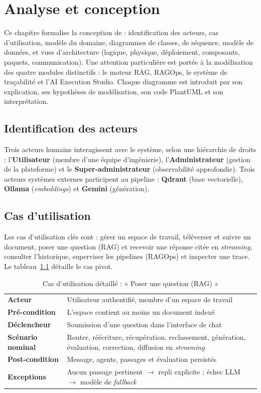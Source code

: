 \chapter{Analyse et conception}
\label{chap:conception}

Ce chapitre formalise la conception de \devpilot{} : identification des acteurs,
cas d'utilisation, modèle du domaine, diagrammes de classes, de séquence, modèle
de données, et vues d'architecture (logique, physique, déploiement, composants,
paquets, communication). Une attention particulière est portée à la modélisation
des quatre modules distinctifs : le moteur RAG, RAGOps, le système de traçabilité
et l'AI Execution Studio. Chaque diagramme est introduit par son explication, ses
hypothèses de modélisation, son code PlantUML et son interprétation.

\section{Identification des acteurs}
Trois acteurs humains interagissent avec le système, selon une hiérarchie de
droits : l'\textbf{Utilisateur} (membre d'une équipe d'ingénierie), l'\textbf{Administrateur}
(gestion de la plateforme) et le \textbf{Super-administrateur} (observabilité
approfondie). Trois acteurs systèmes externes participent au pipeline :
\textbf{Qdrant} (base vectorielle), \textbf{Ollama} (\emph{embeddings}) et
\textbf{Gemini} (génération).

\section{Cas d'utilisation}
Les cas d'utilisation clés sont : gérer un espace de travail, téléverser et suivre
un document, poser une question (RAG) et recevoir une réponse citée en
\emph{streaming}, consulter l'historique, superviser les pipelines (RAGOps) et
inspecter une trace. Le tableau~\ref{tab:uc} détaille le cas pivot.

\begin{table}[H]
\centering\caption{Cas d'utilisation détaillé : « Poser une question (RAG) »}
\label{tab:uc}\small
\begin{tabularx}{\textwidth}{@{}>{\bfseries}l X@{}}
\toprule
Acteur & Utilisateur authentifié, membre d'un espace de travail \\
Pré-condition & L'espace contient au moins un document indexé \\
Déclencheur & Soumission d'une question dans l'interface de chat \\
Scénario nominal & Router, réécriture, récupération, reclassement, génération, évaluation, correction, diffusion en \emph{streaming} \\
Post-condition & Message, agents, passages et évaluation persistés \\
Exceptions & Aucun passage pertinent $\rightarrow$ repli explicite ; échec LLM $\rightarrow$ modèle de \emph{fallback} \\
\bottomrule
\end{tabularx}
\end{table}


